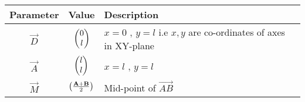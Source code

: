 \begin{tabular}{|c|c|p{5cm}|}
\hline
\textbf{Parameter} & \textbf{Value} & \textbf{Description} \\
\hline
    $\vec{D}$ & $\begin{pmatrix}0  \\ l \end{pmatrix}$ & $x = 0$ , $y = l$ i.e $x,y$ are co-ordinates of axes in XY-plane \\
\hline
	$\vec{A}$ & $\begin{pmatrix}l \\ l \end{pmatrix}$ & $x = l$ , $y = l$ \\
 \hline
    $\vec{M}$ & $\left(\frac{\mathbf{A+B}}{2}\right)$ & Mid-point of $\vec{AB}$ \\
\hline
\end{tabular}
